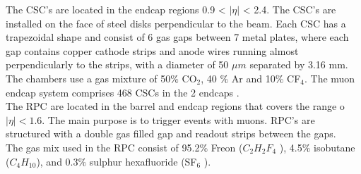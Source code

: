 The CSC's are located in the endcap regions 0.9 < $|\eta|$ < 2.4. The CSC's are installed on the face of steel disks perpendicular to the beam. 
Each CSC has a trapezoidal shape and consist of 6 gas gaps between 7 metal plates, where each gap contains copper cathode strips and anode wires running almost perpendicularly to
the strips, with a diameter of 50 $\mu m$ separated by 3.16 mm. 
The chambers use a gas mixture of 50$\%$ CO$_2$, 40 $\%$ Ar and 10$\%$ CF$_4$. The muon endcap system comprises 468 CSCs in the 2 endcaps \cite{cms-manual,cms7}.
\\

The RPC are located in the barrel and endcap regions that covers the range o $|\eta|<1.6$. The main purpose is to trigger events with muons. 
RPC's are structured with a double gas filled gap and readout strips between the gaps.\\
 The gas mix used in the RPC consist of 95.2$\%$ Freon
($C_2 H_2 F_4$ ), 4.5$\%$ isobutane ($C_4 H_{10}$), and 0.3$\%$ sulphur hexafluoride (SF$_6$ )\cite{cms7}.\\



